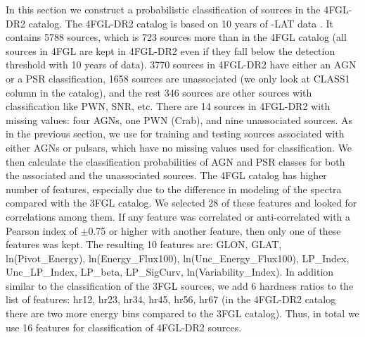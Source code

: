 In this section we construct a probabilistic classification of sources in the 4FGL-DR2 catalog. The 4FGL-DR2 catalog \citep{2020arXiv200511208B} 
is based on 10 years of \Fermi-LAT data \citep[compared to 8 years of data in the 4FGL catalog,][]{2020ApJS..247...33A}.
It contains 5788 sources, which is 723 sources more than in the 4FGL catalog (all sources in 4FGL are kept in 4FGL-DR2 even if they fall
below the detection threshold with 10 years of data). 
3770 sources in 4FGL-DR2 have either an  AGN or a PSR classification, 
1658 sources are unassociated (we only look at CLASS1 column in the catalog), and the rest 346 sources are other sources with classification like PWN, SNR, etc.
There are 14 sources in 4FGL-DR2 with missing values: four AGNs, one PWN (Crab), and nine unassociated sources.
As in the previous section, we use for training and testing sources associated with either AGNs or pulsars,
which have no missing values used for classification.
We then calculate the classification probabilities of AGN and PSR classes for both the associated and the unassociated sources.
The 4FGL catalog has higher number of features, especially due to the difference in modeling of the spectra compared with the 3FGL catalog. 
We selected 28 of these features and looked for correlations among them. If any feature was correlated or anti-correlated with a Pearson index of $\pm$0.75 or higher with another feature, then only one of these features was kept. 
The resulting 10 features are:
GLON, GLAT, ln(Pivot\_Energy), ln(Energy\_Flux100), ln(Unc\_Energy\_Flux100), LP\_Index, Unc\_LP\_Index, LP\_beta, LP\_SigCurv, ln(Variability\_Index).
In addition similar to the classification of the 3FGL sources, we add 6 hardness ratios to the list of features:
hr12, hr23, hr34, hr45, hr56, hr67 (in the 4FGL-DR2 catalog there are two more energy bins compared to the 3FGL catalog).
Thus, in total we use 16 features for classification of 4FGL-DR2 sources.

